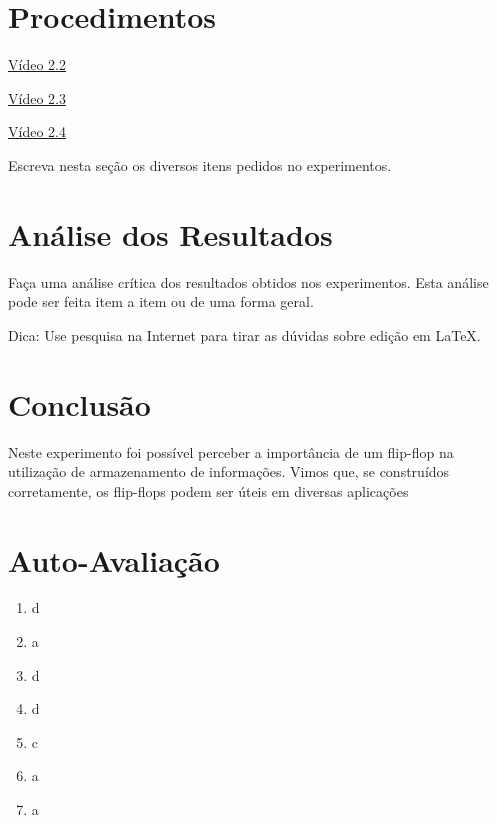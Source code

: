 \documentclass[12pt]{article}
\begin{document}
\section{Procedimentos}
\label{sec:Procedimentos}


\href{https://youtu.be/azJt3y337BE}{Vídeo 2.2}

\href{https://youtu.be/1GDHpbQ8CnU}{Vídeo 2.3}

\href{https://youtu.be/c2MW7RQl_7s}{Vídeo 2.4}

Escreva nesta seção os diversos itens pedidos no experimentos. 


\section{Análise dos Resultados}
\label{sec:Resultados}

Faça uma análise crítica dos resultados obtidos nos experimentos. Esta análise pode ser feita item a item ou de uma forma geral.

Dica: Use pesquisa na Internet para tirar as dúvidas sobre edição em \LaTeX .

\section{Conclusão}
\label{sec:Conclusao}

Neste experimento foi possível perceber a importância de um flip-flop na utilização de armazenamento de informações. Vimos que, se construídos corretamente, os flip-flops podem ser úteis em diversas aplicações

\newpage 
\section*{Auto-Avaliação}

\begin{enumerate}
    \item d
    \item a
    \item d
    \item d
    \item c
    \item a
    \item a
\end{enumerate}
\end{document}
